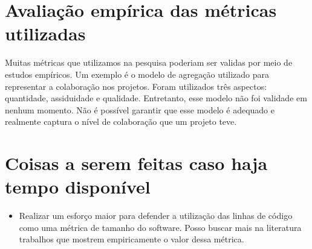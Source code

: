 \section{Avaliação empírica das métricas utilizadas}

Muitas métricas que utilizamos na pesquisa poderiam ser validas por meio de estudos empíricos. Um exemplo é o modelo de agregação utilizado para representar a colaboração nos projetos. Foram utilizados três aspectos: quantidade, assiduidade e qualidade. Entretanto, esse modelo não foi validade em nenhum momento. Não é possível garantir que esse modelo é adequado e realmente captura o nível de colaboração que um projeto teve.


\section{Coisas a serem feitas caso haja tempo disponível}

\begin{itemize}
\item Realizar um esforço maior para defender a utilização das linhas de código como uma métrica de tamanho do software. Posso buscar mais na literatura trabalhos que mostrem empiricamente o valor dessa métrica.
\end{itemize}